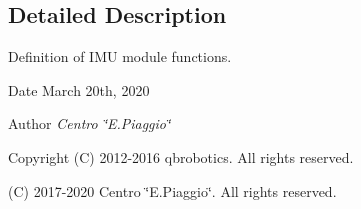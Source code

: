 \subsection{Detailed Description}
Definition of I\+MU module functions. 

\begin{DoxyDate}{Date}
March 20th, 2020 
\end{DoxyDate}
\begin{DoxyAuthor}{Author}
{\itshape Centro \char`\"{}\+E.\+Piaggio\char`\"{}} 
\end{DoxyAuthor}
\begin{DoxyCopyright}{Copyright}
(C) 2012-\/2016 qbrobotics. All rights reserved. 

(C) 2017-\/2020 Centro \char`\"{}\+E.\+Piaggio\char`\"{}. All rights reserved. 
\end{DoxyCopyright}

